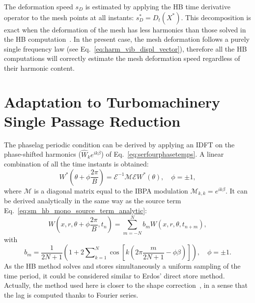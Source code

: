 The deformation speed $s_D$ is estimated by applying the HB time
derivative operator to the mesh points at all instants:
$s_D^*=D_t(X^*)$. This decomposition is exact when the
deformation of the mesh has less harmonics than those solved in the
HB computation~\cite{JDufour2009}. In the present case, the mesh
deformation follows a purely single frequency law (see
Eq.~\eqref{eq:harm_vib_displ_vector}), therefore all the HB computations will correctly
estimate the mesh deformation speed regardless of their harmonic content.

\section{Adaptation to Turbomachinery Single Passage Reduction}
\label{sec:Adptatreduction}

The phaselag periodic condition can be derived by applying an
IDFT on the phase-shifted harmonics ($\widehat{W}_ke^{ik\beta}$) of
Eq.~\eqref{eq:serfourphasetemps}. A linear
combination of all the time instants is obtained:
\begin{equation}
  W^*\left(\theta+\phi\frac{2\pi}{B}\right)=\mathcal{E}^{-1}\mathcal{M}\mathcal{E}W^*(\theta),\quad \phi=\pm 1,
\end{equation}
where $\mathcal{M}$ is a diagonal matrix equal to the IBPA modulation
$\mathcal{M}_{k,k}=e^{i k\beta}$. It can be derived
analytically in the same way as the source term 
Eq.~\eqref{eq:sm_hb_mono_source_term_analytic}:
\begin{equation}
  W\left(x, r, \theta+\phi\frac{2\pi}{B}, t_n\right) =\sum_{m=-N}^N
  b_mW(x, r, \theta, t_{n+m}), 
\end{equation}
with
\begin{equation}
  b_m=\frac{1}{2N+1}\left(1+2\sum\nolimits_{k=1}^N\cos\left[k\left(2\pi
        \frac{m}{2N+1}-\phi \beta\right)\right]\right),\quad \phi=\pm 1.
\end{equation}
As the HB method solves and stores simultaneously a uniform sampling
of the time period, it could be considered similar to Erdos' direct
store method. Actually, the method used here is closer to the shape
correction~\cite{He1990}, in a sense that the lag is
computed thanks to Fourier series.
